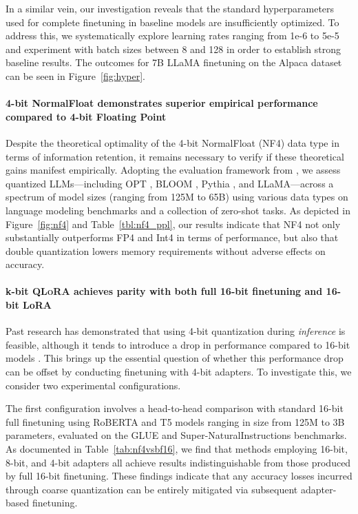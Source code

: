 In a similar vein, our investigation reveals that the standard hyperparameters used for complete finetuning in baseline models are insufficiently optimized. To address this, we systematically explore learning rates ranging from 1e-6 to 5e-5 and experiment with batch sizes between 8 and 128 in order to establish strong baseline results. The outcomes for 7B LLaMA finetuning on the Alpaca dataset can be seen in Figure~\ref{fig:hyper}.

\paragraph{4-bit NormalFloat demonstrates superior empirical performance compared to 4-bit Floating Point}

Despite the theoretical optimality of the 4-bit NormalFloat (NF4) data type in terms of information retention, it remains necessary to verify if these theoretical gains manifest empirically. Adopting the evaluation framework from \citet{dettmers2022case}, we assess quantized LLMs—including OPT \citep{zhang2022opt}, BLOOM \cite{scao2022bloom}, Pythia \cite{biderman2023pythia}, and LLaMA—across a spectrum of model sizes (ranging from 125M to 65B) using various data types on language modeling benchmarks and a collection of zero-shot tasks. As depicted in Figure~\ref{fig:nf4} and Table~\ref{tbl:nf4_ppl}, our results indicate that NF4 not only substantially outperforms FP4 and Int4 in terms of performance, but also that double quantization lowers memory requirements without adverse effects on accuracy.

\paragraph{k-bit \textsc{QLoRA} achieves parity with both full 16-bit finetuning and 16-bit LoRA}

Past research has demonstrated that using 4-bit quantization during \emph{inference} is feasible, although it tends to introduce a drop in performance compared to 16-bit models \citep{dettmers2022case,frantar2022gptq}. This brings up the essential question of whether this performance drop can be offset by conducting finetuning with 4-bit adapters. To investigate this, we consider two experimental configurations.

The first configuration involves a head-to-head comparison with standard 16-bit full finetuning using RoBERTA and T5 models ranging in size from 125M to 3B parameters, evaluated on the GLUE and Super-NaturalInstructions benchmarks. As documented in Table~\ref{tab:nf4vsbf16}, we find that methods employing 16-bit, 8-bit, and 4-bit adapters all achieve results indistinguishable from those produced by full 16-bit finetuning. These findings indicate that any accuracy losses incurred through coarse quantization can be entirely mitigated via subsequent adapter-based finetuning.

